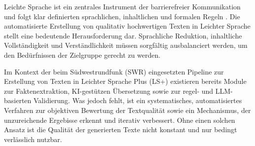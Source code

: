 Leichte Sprache ist ein zentrales Instrument der barrierefreier Kommunikation und folgt klar definierten sprachlichen, inhaltlichen und formalen Regeln \cite{maas_leichte_2015}. Die automatisierte Erstellung von qualitativ hochwertigen Texten in Leichter Sprache stellt eine bedeutende Herausforderung dar. Sprachliche Reduktion, inhaltliche Vollständigkeit und Verständlichkeit müssen sorgfältig ausbalanciert werden, um den Bedürfnissen der Zielgruppe gerecht zu werden.

Im Kontext der beim Südwestrundfunk (SWR) eingesetzten Pipeline zur Erstellung von Texten in Leichter Sprache Plus (LS+) existieren bereits Module zur Faktenextraktion, KI-gestützen Übersetzung sowie zur regel- und LLM-basierten Validierung. Was jedoch fehlt, ist ein systematisches, automatisiertes Verfahren zur objektiven Bewertung der Textqualität sowie ein Mechanismus, der unzureichende Ergebisse erkennt und iterativ verbessert. Ohne einen solchen Ansatz ist die Qualität der generierten Texte nicht konstant und nur bedingt verlässlich nutzbar.